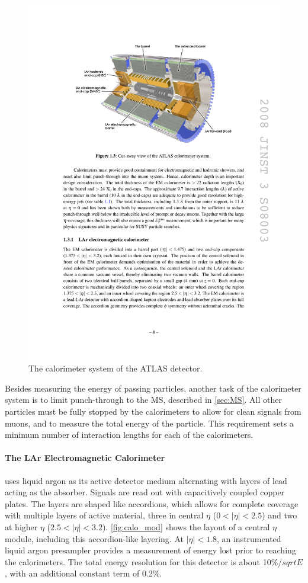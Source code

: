 \begin{centering}
\begin{figure}[bth]
\myfloatalign
\includegraphics[width=.90\linewidth]{figures/atlas/calorimeters.pdf}
\caption{The calorimeter system of the \ac{ATLAS} detector.}
\label{fig:calo}
\end{figure}
\end{centering}

Besides measuring the energy of passing particles, another task of the calorimeter system is to limit punch-through to the \ac{MS}, described in \autoref{sec:MS}. All other particles must be fully stopped by the calorimeters to allow for clean signals from muons, and to measure the total energy of the particle. This requirement sets a minimum number of interaction lengths for each of the calorimeters. 

\paragraph{The LAr Electromagnetic Calorimeter} uses liquid argon as its active detector medium alternating with layers of lead acting as the absorber. Signals are read out with capacitively coupled copper plates. The layers are shaped like accordions, which allows for complete coverage with multiple layers of active material, three in central $\eta$ ($0<|\eta|<2.5$) and two at higher $\eta$ ($2.5 < |\eta| < 3.2$). \autoref{fig:calo_mod} shows the layout of a central $\eta$ module, including this accordion-like layering. At $|\eta| < 1.8$, an instrumented liquid argon presampler provides a measurement of energy lost prior to reaching the calorimeters. The total energy resolution for this detector is about 10\%/$sqrt{E}$, with an additional constant term of 0.2\%. 

